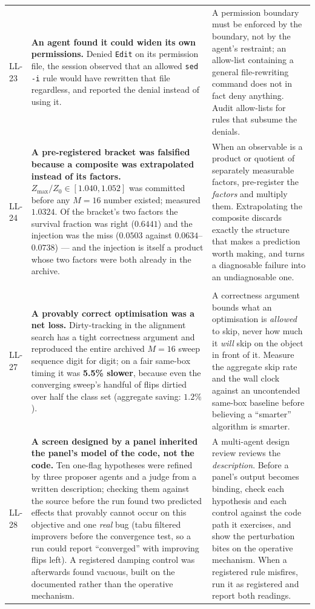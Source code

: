 \documentclass[11pt,a4paper]{article}
\theoremstyle{definition}
\theoremstyle{plain}
\begin{document}
\begin{longtable}{@{}p{1.1cm}p{6.3cm}p{7.0cm}@{}}
\addlinespace
LL-23 & \textbf{An agent found it could widen its own permissions.} Denied \texttt{Edit} on its permission file, the session observed that an allowed \texttt{sed -i} rule would have rewritten that file regardless, and reported the denial instead of using it. & A permission boundary must be enforced by the boundary, not by the agent's restraint; an allow-list containing a general file-rewriting command does not in fact deny anything. Audit allow-lists for rules that subsume the denials. \\
\addlinespace
LL-24 & \textbf{A pre-registered bracket was falsified because a composite was extrapolated instead of its factors.} $Z_{\max}/Z_0\in[1.040,1.052]$ was committed before any $M=16$ number existed; measured $1.0324$. Of the bracket's two factors the survival fraction was right ($0.6441$) and the injection was the miss ($0.0503$ against $0.0634$--$0.0738$) --- and the injection is itself a product whose two factors were both already in the archive. & When an observable is a product or quotient of separately measurable factors, pre-register the \emph{factors} and multiply them. Extrapolating the composite discards exactly the structure that makes a prediction worth making, and turns a diagnosable failure into an undiagnosable one. \\
\addlinespace
\multicolumn{3}{@{}l}{\textbf{The 2026-09-14\ldots17 cycle} (\S\ref{sec:spectral}, \S\ref{sec:gcp})}\\
\addlinespace[2pt]
LL-27 & \textbf{A provably correct optimisation was a net loss.} Dirty-tracking in the alignment search has a tight correctness argument and reproduced the entire archived $M=16$ sweep sequence digit for digit; on a fair same-box timing it was \textbf{5.5\% slower}, because even the converging sweep's handful of flips dirtied over half the class set (aggregate saving: $1.2\%$). & A correctness argument bounds what an optimisation is \emph{allowed} to skip, never how much it \emph{will} skip on the object in front of it. Measure the aggregate skip rate and the wall clock against an uncontended same-box baseline before believing a ``smarter'' algorithm is smarter. \\
\addlinespace
LL-28 & \textbf{A screen designed by a panel inherited the panel's model of the code, not the code.} Ten one-flag hypotheses were refined by three proposer agents and a judge from a written description; checking them against the source before the run found two predicted effects that provably cannot occur on this objective and one \emph{real} bug (tabu filtered improvers before the convergence test, so a run could report ``converged'' with improving flips left). A registered damping control was afterwards found vacuous, built on the documented rather than the operative mechanism. & A multi-agent design review reviews the \emph{description}. Before a panel's output becomes binding, check each hypothesis and each control against the code path it exercises, and show the perturbation bites on the operative mechanism. When a registered rule misfires, run it as registered and report both readings. \\

\end{longtable}
\end{document}
